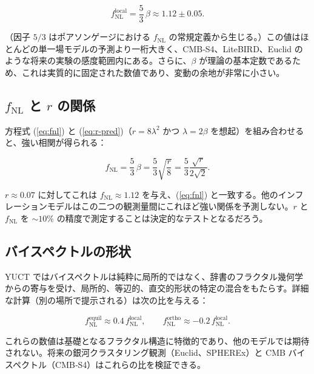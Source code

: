 \documentclass[11pt,a4paper]{article}
\theoremstyle{remark}
\begin{document}
	\begin{equation}
		f_{\text{NL}}^{\text{local}} = \frac{5}{3}\,\beta \approx 1.12 \pm 0.05.
		\label{eq:fnl}
	\end{equation}
	
	（因子 $5/3$ はポアソンゲージにおける $f_{\text{NL}}$ の常規定義から生じる。）この値はほとんどの単一場モデルの予測より一桁大きく、CMB‑S4、LiteBIRD、Euclid のような将来の実験の感度範囲内にある。さらに、$\beta$ が理論の基本定数であるため、これは実質的に固定された数値であり、変動の余地が非常に小さい。
	
	\subsection{$f_{\text{NL}}$ と $r$ の関係}
	
	方程式 (\ref{eq:fnl}) と (\ref{eq:r-pred})（$r = 8\lambda^2$ かつ $\lambda = 2\beta$ を想起）を組み合わせると、強い相関が得られる：
	
	\begin{equation}
		f_{\text{NL}} = \frac{5}{3}\,\beta = \frac{5}{3}\sqrt{\frac{r}{8}} = \frac{5}{3}\frac{\sqrt{r}}{2\sqrt{2}}.
		\label{eq:fnl-r}
	\end{equation}
	
	$r \approx 0.07$ に対してこれは $f_{\text{NL}} \approx 1.12$ を与え、(\ref{eq:fnl}) と一致する。他のインフレーションモデルはこの二つの観測量間にこれほど強い関係を予測しない。$r$ と $f_{\text{NL}}$ を $\sim 10\%$ の精度で測定することは決定的なテストとなるだろう。
	
	\subsection{バイスペクトルの形状}
	
	YUCT ではバイスペクトルは純粋に局所的ではなく、辞書のフラクタル幾何学からの寄与を受け、局所的、等辺的、直交的形状の特定の混合をもたらす。詳細な計算（別の場所で提示される）は次の比を与える：
	
	\begin{equation}
		f_{\text{NL}}^{\text{equil}} \approx 0.4\, f_{\text{NL}}^{\text{local}}, \qquad
		f_{\text{NL}}^{\text{ortho}} \approx -0.2\, f_{\text{NL}}^{\text{local}}.
		\label{eq:fnl-shapes}
	\end{equation}
	
	これらの数値は基礎となるフラクタル構造に特徴的であり、他のモデルでは期待されない。将来の銀河クラスタリング観測（Euclid、SPHEREx）と CMB バイスペクトル（CMB‑S4）はこれらの比を検証できる。
	
\end{document}
